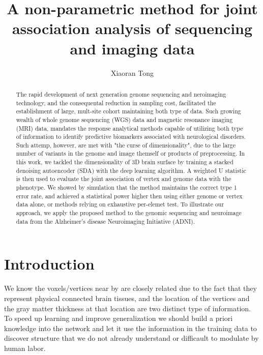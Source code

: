 \documentclass[twocolumn]{article}
\author{Xiaoran Tong}
\begin{document}
\title{A non-parametric method for joint association analysis of sequencing and imaging data}
\maketitle

\begin{abstract}
The rapid development of next generation genome sequencing and neroimaging technology, and the consequental reduction in sampling cost, facilitated the establishment of large, mult-site cohort maintaining both type of data. Such growing wealth of whole genome sequencing (WGS) data and magnetic resonance imaging (MRI) data, mandates the response analytical methods capable of utilizing both type of information to identify predictive biomarkers associated with neurological disorders. Such attemp, however, are met with "the curse of dimensionality", due to the large number of variants in the genome and image themself or products of preprocessing. In this work, we tackled the dimensionality of 3D brain surface by training a stacked denoising autoencoder (SDA) with the deep learning algorithm. A weighted U statistic is then used to evaluate the joint association of vertex and genome data with the phenotype. We showed by simulation that the method maintains the correct type 1 error rate, and achieved a statistical power higher then using either genome or vertex data alone, or methods relying on exhaustive per-elemet test. To illustrate our approach, we apply the proposed method to the genomic sequencing and neuroimage data from the Alzheimer's disease Neuroimaging Initiative (ADNI).
\end{abstract}

\section{Introduction}
We know the voxels/vertices near by are closely related due to the fact that they represent physical connected brain tissues, and the location of the vertices and the gray matter thickness at that location are two distinct type of information.
To speed up learning and improve generalization we should build a priori knowledge into the network and let it use the information in the training data to discover structure that we do not already understand or difficault to modulate by human labor.
\end{document}
